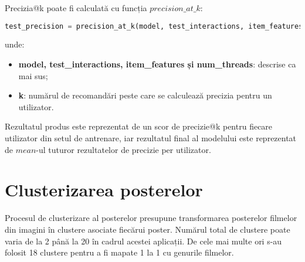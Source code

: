 Precizia@k poate fi calculată cu funcția $precision\_at\_k$:

\begin{lstlisting}[language=Python, caption=Precizia@k a unui model]
test_precision = precision_at_k(model, test_interactions, item_features=item_features, k=k, num_threads=threads).mean()
\end{lstlisting}
unde:
\begin{itemize}
	\item \textbf{model, test\_interactions, item\_features și num\_threads}: descrise ca mai sus;
	\item \textbf{k}: numărul de recomandări peste care se calculează precizia pentru un utilizator.
\end{itemize}
Rezultatul produs este reprezentat de un scor de precizie@k pentru fiecare utilizator din setul de antrenare, iar rezultatul final al modelului este reprezentat de $mean$-ul tuturor rezultatelor de precizie per utilizator.

\section{Clusterizarea posterelor}
Procesul de clusterizare al posterelor presupune transformarea posterelor filmelor din imagini în clustere asociate fiecărui poster. Numărul total de clustere poate varia de la 2 până la 20 în cadrul acestei aplicații. De cele mai multe ori s-au folosit 18 clustere pentru a fi mapate 1 la 1 cu genurile filmelor.


